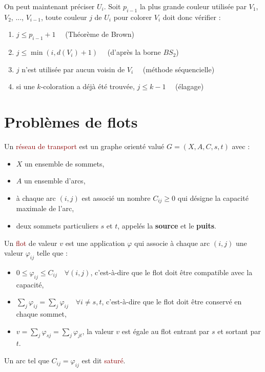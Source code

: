 \documentclass{article}
\newcommand{\red}[1]{\textcolor{darkred}{#1}}
\begin{document}
On peut maintenant préciser $U_i$. Soit $p_{i-1}$ la plus grande couleur utilisée par $V_1$, $V_2$, ..., $V_{i-1}$, toute couleur $j$ de $U_i$ pour colorer $V_i$ doit donc 
vérifier : \begin{enumerate}
\item $j \leq p_{i-1} + 1 \quad $ (Théorème de Brown)
\item $j \leq \min(i, d(V_i)+1) \quad$ (d'après la borne $BS_2$)
\item $j$ n'est utilisée par aucun voisin de $V_i \quad$ (méthode séquencielle)
\item si une $k$-coloration a déjà été trouvée, $j \leq k-1 \quad$ (élagage)
\end{enumerate}
\newpage
\section{Problèmes de flots}

Un \red{réseau de transport} est un graphe orienté valué $G=(X,A,C,s,t)$ avec : \begin{itemize}
\item $X$ un ensemble de sommets,
\item $A$ un ensemble d’arcs,
\item à chaque arc $(i,j)$  est associé un nombre $C_{ij} \geq0$ qui désigne la capacité maximale de l’arc,
\item deux sommets particuliers $s$ et $t$, appelés la \textbf{source} et le \textbf{puits}.
\end{itemize}
Un \red{flot} de valeur $v$ est une application $\varphi$ qui associe à chaque arc $(i,j)$ une valeur $\varphi_{ij}$ telle que :
\begin{itemize}
\item $0\leq \varphi_{ij} \leq C_{ij} \quad \forall (i,j)$, c'est-à-dire que le flot doit être compatible avec la capacité,
\item $\sum_j \varphi_{ij} = \sum_j \varphi_{ij} \quad \forall i \neq s,t$, c'est-à-dire que le flot doit être conservé en chaque sommet,
\item $v = \sum_j \varphi_{sj} = \sum_j \varphi_{jt}$, la valeur $v$ est égale au flot entrant par $s$ et sortant par $t$.
\end{itemize}
\noindent Un arc tel que $C_{ij} = \varphi_{ij}$ est dit \red{saturé}.\\
\end{document}
